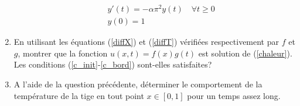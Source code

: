 \begin{exo}
\begin{enumerate}
        \begin{eqnarray}
            & & y'(t) = -\alpha \pi^2 y(t) \quad \forall t \geq 0 \label{diffT}\\
            & & y(0)=1 \label{ciT}
        \end{eqnarray}
        \item En utilisant les équations (\ref{diffX}) et (\ref{diffT}) vérifiées respectivement par $f$ et $g$, montrer que la fonction $u(x,t) = f(x)g(t)$ est solution de (\ref{chaleur}). Les conditions (\ref{c_init}-\ref{c_bord}) sont-elles satisfaites?
        \item A l'aide de la question précédente, déterminer le comportement de la température de la tige en tout point $x \in [0,1]$ pour un temps assez long.
    \end{enumerate}
\end{exo}

